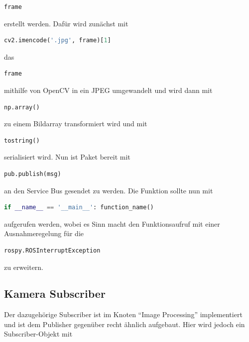 \begin{lstlisting}[language=Python]
frame
\end{lstlisting}

erstellt werden. Dafür wird zunächst mit 

\begin{lstlisting}[language=Python]
cv2.imencode('.jpg', frame)[1]
\end{lstlisting}

das 

\begin{lstlisting}[language=Python]
frame
\end{lstlisting}

mithilfe von OpenCV in ein JPEG umgewandelt und wird dann mit 

\begin{lstlisting}[language=Python]
np.array()
\end{lstlisting}

zu einem Bildarray transformiert wird und mit

\begin{lstlisting}[language=Python]
tostring()
\end{lstlisting}

serialisiert wird. Nun ist Paket bereit mit 

\begin{lstlisting}[language=Python]
pub.publish(msg)
\end{lstlisting}

an den Service Bus gesendet zu werden. Die Funktion sollte nun mit 

\begin{lstlisting}[language=Python]
if __name__ == '__main__': function_name()
\end{lstlisting}

aufgerufen werden, wobei es Sinn macht den Funktionsaufruf mit einer Ausnahmeregelung für die 

\begin{lstlisting}[language=Python]
rospy.ROSInterruptException
\end{lstlisting}

zu erweitern. 


\subsection{Kamera Subscriber}
Der dazugehörige Subscriber ist im Knoten ``Image Processing'' implementiert und ist dem Publisher gegenüber recht ähnlich aufgebaut. Hier wird jedoch ein Subscriber-Objekt mit 

